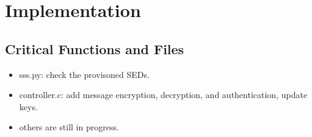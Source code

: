 \documentclass[11pt,oneside,onecolumn,letterpaper]{article}
\begin{document}
\section{Implementation}
\subsection{Critical Functions and Files}
\begin{itemize}
  \item sss.py: check the provisoned SEDs.
  \item controller.c: add message encryption, decryption, and authentication, update keys.
  \item others are still in progress.
\end{itemize}



\end{document}
